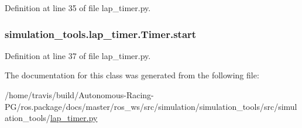 Definition at line 35 of file lap\+\_\+timer.\+py.

\subsubsection[{\texorpdfstring{start}{start}}]{\setlength{\rightskip}{0pt plus 5cm}simulation\+\_\+tools.\+lap\+\_\+timer.\+Timer.\+start}\hypertarget{classsimulation__tools_1_1lap__timer_1_1_timer_afc51d0e4a6aa0e19be5c8622352b9afe}{}\label{classsimulation__tools_1_1lap__timer_1_1_timer_afc51d0e4a6aa0e19be5c8622352b9afe}


Definition at line 37 of file lap\+\_\+timer.\+py.



The documentation for this class was generated from the following file\+:\begin{DoxyCompactItemize}
\item 
/home/travis/build/\+Autonomous-\/\+Racing-\/\+P\+G/ros.\+package/docs/master/ros\+\_\+ws/src/simulation/simulation\+\_\+tools/src/simulation\+\_\+tools/\hyperlink{lap__timer_8py}{lap\+\_\+timer.\+py}\end{DoxyCompactItemize}
